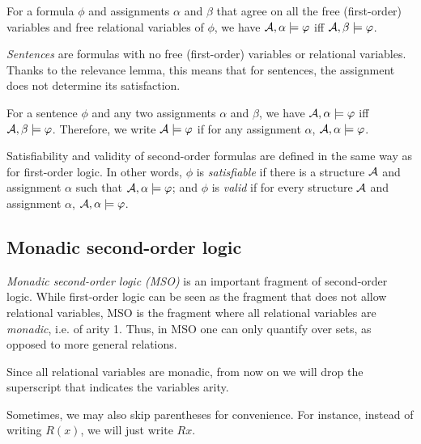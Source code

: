 \documentclass[11pt,twoside=off,numbers=noenddot]{scrbook}
\begin{document}
\begin{lemma}
  For a formula $\phi$ and assignments $\alpha$ and $\beta$ that agree on all the free (first-order) variables and free relational variables of $\phi$, we have $\mathcal{A}, \alpha \models \varphi$ iff $\mathcal{A}, \beta \models \varphi$.
\end{lemma}

\emph{Sentences} are formulas with no free (first-order) variables or relational variables. Thanks to the relevance lemma, this means that for sentences, the assignment does not determine its satisfaction.

\begin{proposition}
  For a sentence $\phi$ and any two assignments $\alpha$ and $\beta$, we have $\mathcal{A}, \alpha \models \varphi$ iff $\mathcal{A}, \beta \models \varphi$. Therefore, we write $\mathcal{A} \models \varphi$ if for any assignment $\alpha$, $\mathcal{A}, \alpha \models \varphi$.
\end{proposition}

Satisfiability and validity of second-order formulas are defined in the same way as for first-order logic. In other words, $\phi$ is \emph{satisfiable} if there is a structure $\mathcal{A}$ and assignment $\alpha$ such that $\mathcal{A}, \alpha \models \varphi$; and $\phi$ is \emph{valid} if for every structure $\mathcal{A}$ and assignment $\alpha$, $\mathcal{A}, \alpha \models \varphi$.

\subsection{Monadic second-order logic}
\emph{Monadic second-order logic (MSO)} is an important fragment of second-order logic. While first-order logic can be seen as the fragment that does not allow relational variables, MSO is the fragment where all relational variables are \emph{monadic}, i.e. of arity 1. Thus, in MSO one can only quantify over sets, as opposed to more general relations.

\begin{abuse}
  Since all relational variables are monadic, from now on we will drop the superscript that indicates the variables arity.
\end{abuse}

\begin{abuse}
  Sometimes, we may also skip parentheses for convenience. For instance, instead of writing $R(x)$, we will just write $R x$.
\end{abuse}
\end{document}
